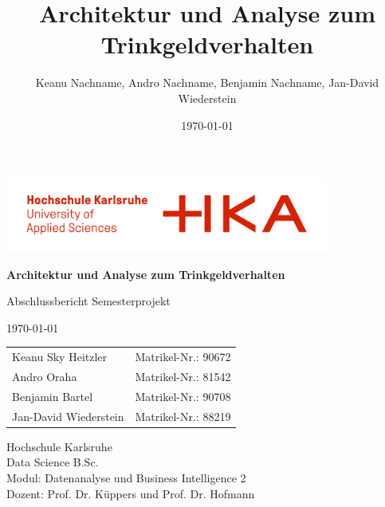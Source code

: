 \documentclass[
    12pt,               
    a4paper,        
    ngerman            
]{scrartcl}
\title{Architektur und Analyse zum Trinkgeldverhalten}
\author{Keanu Nachname, Andro Nachname, Benjamin Nachname, Jan-David Wiederstein}
\date{\today}
\begin{document}
\begin{titlepage}
    \centering
    
    \vfill 
    \includegraphics[width=0.8\textwidth]{logo.png}\par\vspace{1cm}
    
    {\Huge \bfseries Architektur und Analyse zum Trinkgeldverhalten\par} 
    
    \vspace{0.5cm}
    
    {\LARGE Abschlussbericht Semesterprojekt\par} 

    \vspace{0.5cm}

    {\large \today\par} 

    \vspace{1.5cm} 

    \large
    \begin{tabular}{l l}
        Keanu Sky Heitzler & Matrikel-Nr.: 90672 \\
        Andro Oraha & Matrikel-Nr.: 81542 \\
        Benjamin Bartel & Matrikel-Nr.: 90708 \\
        Jan-David Wiederstein & Matrikel-Nr.: 88219 \\
    \end{tabular}

    \vfill

    {\normalsize
    Hochschule Karlsruhe \\
    Data Science B.Sc. \\
    Modul: Datenanalyse und Business Intelligence 2 \\
    Dozent: Prof. Dr. Küppers und Prof. Dr. Hofmann
    \par}
    
\end{titlepage}

\end{document}
